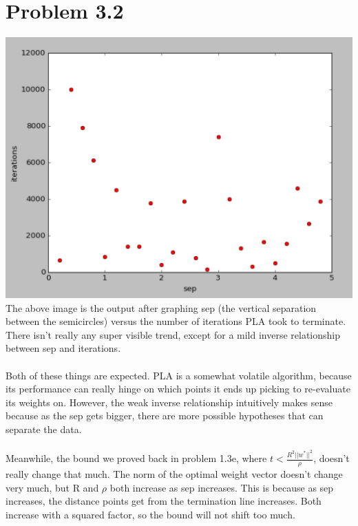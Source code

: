 \documentclass[12pt]{article}
\begin{document}
\section*{Problem 3.2}
\includegraphics[scale=.5]{3-2.png}
\\ The above image is the output after graphing sep (the vertical separation between the semicircles) versus the number of iterations PLA took to terminate. There isn't really any super visible trend, except for a mild inverse relationship between sep and iterations.
\\ \\ Both of these things are expected. PLA is a somewhat volatile algorithm, because its performance can really hinge on which points it ends up picking to re-evaluate its weights on. However, the weak inverse relationship intuitively makes sense because as the sep gets bigger, there are more possible hypotheses that can separate the data.
\\ \\ Meanwhile, the bound we proved back in problem 1.3e, where $t < \frac{R^2||w^*||^2}{\rho}$, doesn't really change that much. The norm of the optimal weight vector doesn't change very much, but R and $\rho$ both increase as sep increases. This is because as sep increases, the distance points get from the termination line increases. Both increase with a squared factor, so the bound will not shift too much.
\end{document}
